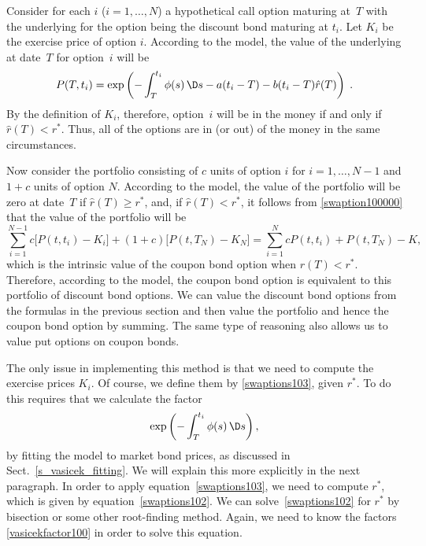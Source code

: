 Consider for each $i$ ($i=1,\ldots,N$) a hypothetical call option maturing at~$T$ with the underlying for the option being the discount bond maturing at $t_i$.  Let $K_i$ be the exercise price of option $i$.  According to the model, the value of the underlying at date~$T$ for option~$i$ will be 
$$P(T,t_i) = \exp\left(-\int_T^{t_i} \phi(s)\,\D s-a(t_i-T)-b(t_i-T)\hat{r}(T)\right)\; .$$
By the definition of $K_i$, therefore, option~$i$ will be in the money if and only if 
$\hat{r}(T) < r^*$.
Thus, all of the options are in (or out) of the money in the same circumstances.  

Now consider the portfolio consisting of $c$ units of option $i$ for $i=1,\ldots,N-1$ and $1+c$ units of option $N$.  According to the model, the value of the portfolio will be zero at date~$T$ if $\hat{r}(T) \geq r^*$, and, if $\hat{r}(T)<r^*$, it follows from \eqref{swaption100000} that the value of the portfolio will be 
$$
\sum_{i=1}^{N-1}c\big[P(t,t_i)-K_i\big]+ (1+c)\big[P(t,T_N)-K_N\big] 
= \sum_{i=1}^NcP(t,t_i)+ P(t,T_N) - K,
$$
which is the intrinsic value of the coupon bond option when $r(T)<r^*$.  Therefore, according to the model,  the coupon bond option is equivalent to this portfolio of discount bond options.  We can value the discount bond options from the formulas in the previous section and then value the portfolio and hence the coupon bond option by summing.
The same type of reasoning also allows us to value put options on coupon bonds.

The only issue in implementing this method is that we need to compute the exercise prices $K_i$.  Of course, we define them by  \eqref{swaptions103}, given $r^*$.  To do this requires that we calculate the factor
\begin{equation}\label{vasicekfactor100}
\exp\left(-\int_T^{t_i} \phi(s)\,\D s\right),
\end{equation}
by fitting the model to market bond prices, as discussed in Sect.~\ref{s_vasicek_fitting}.  We will explain this more explicitly in the next paragraph.  In order to apply equation~\eqref{swaptions103}, we need to compute $r^*$, which is given by equation~\eqref{swaptions102}.  We can solve~\eqref{swaptions102} for $r^*$ by bisection or some other root-finding method.  Again, we need to know the factors \eqref{vasicekfactor100}
 in order to solve this equation.

